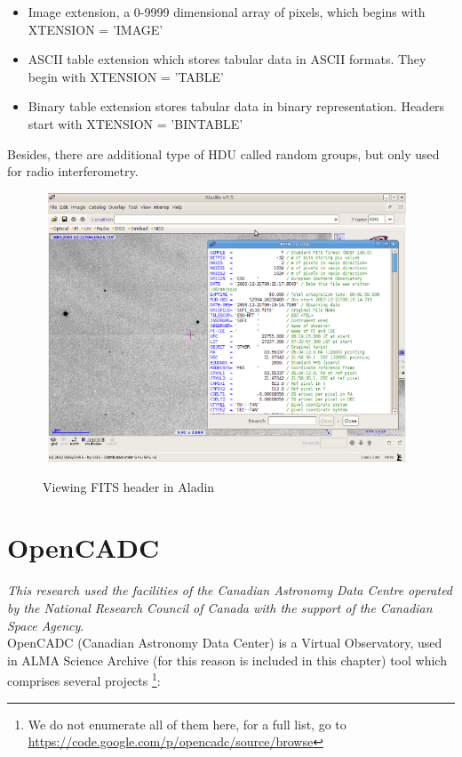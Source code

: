 \begin{itemize}
\item Image extension, a 0-9999 dimensional array of pixels, which begins with XTENSION = 'IMAGE'
\item ASCII table extension which stores tabular data in ASCII formats. They begin with XTENSION = 'TABLE'
\item Binary table extension stores tabular data in binary representation. Headers start with XTENSION = 'BINTABLE'
\end{itemize}

Besides, there are additional type of HDU called random groups, but only used for radio interferometry.
      
\begin{figure}[H]
\centering
\includegraphics[width=11cm,height=8cm]{images/fits_header.png}\\
\caption{Viewing FITS header in Aladin}
\end{figure}






%

\section{OpenCADC}

\textit{This research used the facilities of the Canadian Astronomy Data Centre operated 
by the National Research Council of Canada with the support of the Canadian Space Agency}.\\

OpenCADC (Canadian Astronomy Data Center) is a Virtual Observatory, used in ALMA Science Archive (for this reason is included in this chapter) tool which comprises several projects \footnote{We do not enumerate all of them here, for a full list, go to \url{https://code.google.com/p/opencadc/source/browse}}:

